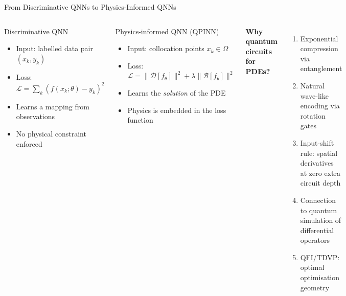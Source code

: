 \documentclass[aspectratio=169,11pt]{beamer}
\begin{document}
\begin{frame}{From Discriminative QNNs to Physics-Informed QNNs}
  \begin{columns}[T]
      \begin{block}{Discriminative QNN}
        \begin{itemize}
          \item Input: labelled data pair $(x_k, y_k)$
          \item Loss: $\mathcal{L}=\sum_k(f(x_k;\theta)-y_k)^2$
          \item Learns a mapping from observations
          \item No physical constraint enforced
        \end{itemize}
      \end{block}
      \smallskip
      \begin{alertblock}{Physics-informed QNN (QPINN)}
        \begin{itemize}
          \item Input: collocation points $x_k\in\Omega$
          \item Loss: $\mathcal{L} = \|\mathcal{D}[f_\theta]\|^2
                           +\lambda\|\mathcal{B}[f_\theta]\|^2$
          \item Learns the \emph{solution} of the PDE
          \item Physics is embedded in the loss function
        \end{itemize}
      \end{alertblock}
      \textbf{Why quantum circuits for PDEs?}
      \begin{enumerate}\itemsep2pt\small
        \item Exponential compression via entanglement
        \item Natural wave-like encoding via rotation gates
        \item Input-shift rule: spatial derivatives at zero
              extra circuit depth
        \item Connection to quantum simulation of
              differential operators
        \item QFI/TDVP: optimal optimisation geometry
      \end{enumerate}
  \end{columns}
\end{frame}

\end{document}

